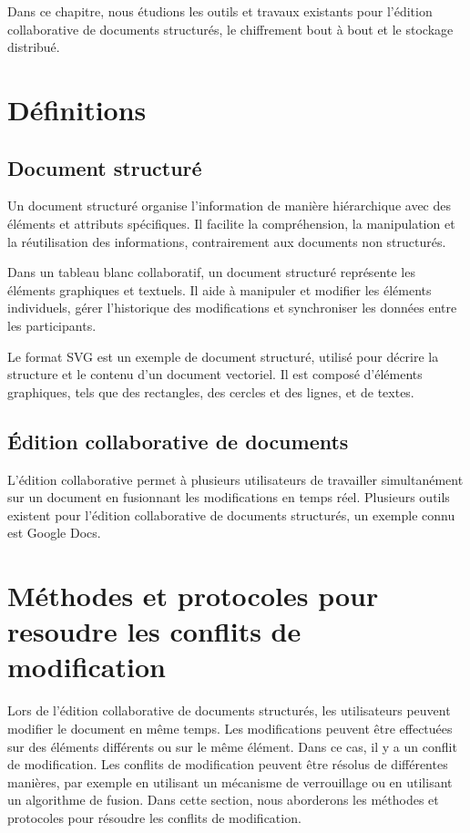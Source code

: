Dans ce chapitre, nous étudions les outils et travaux existants pour l'édition collaborative de documents structurés, le chiffrement bout à bout et le stockage distribué.

\section{Définitions}

\subsection{Document structuré}
Un document structuré organise l'information de manière hiérarchique avec des éléments et attributs spécifiques. Il facilite la compréhension, la manipulation et la réutilisation des informations, contrairement aux documents non structurés.

Dans un tableau blanc collaboratif, un document structuré représente les éléments graphiques et textuels. Il aide à manipuler et modifier les éléments individuels, gérer l'historique des modifications et synchroniser les données entre les participants.

Le format SVG est un exemple de document structuré, utilisé pour décrire la structure et le contenu d'un document vectoriel. Il est composé d'éléments graphiques, tels que des rectangles, des cercles et des lignes, et de textes.

\subsection{Édition collaborative de documents}
L'édition collaborative permet à plusieurs utilisateurs de travailler simultanément sur un document en fusionnant les modifications en temps réel. 
Plusieurs outils existent pour l'édition collaborative de documents structurés, un exemple connu est Google Docs.

\section{Méthodes et protocoles pour resoudre les conflits de modification}

Lors de l'édition collaborative de documents structurés, les utilisateurs peuvent modifier le document en même temps. Les modifications peuvent être effectuées sur des éléments différents ou sur le même élément. Dans ce cas, il y a un conflit de modification. Les conflits de modification peuvent être résolus de différentes manières, par exemple en utilisant un mécanisme de verrouillage ou en utilisant un algorithme de fusion. Dans cette section, nous aborderons les méthodes et protocoles pour résoudre les conflits de modification.

